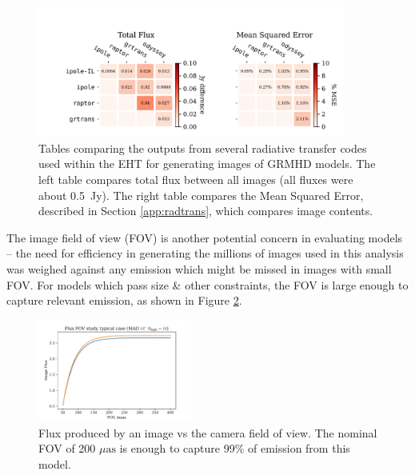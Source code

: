 \begin{figure}
  \centering
  \includegraphics[width=0.9\textwidth]{figures/grmhd_hi_IntegratedUnpolarizeds_plot.pdf}
  \caption{Tables comparing the outputs from several radiative transfer codes used within the EHT for generating images of GRMHD models.  The left table compares total flux between all images (all fluxes were about 0.5~Jy). The right table compares the Mean Squared Error, described in Section \ref{app:radtrans}, which compares image contents. }
  \label{fig:radtrans_grmhd_comp}
\end{figure}

The image field of view (FOV) is another potential concern in evaluating models -- the need for efficiency in generating the millions of images used in this analysis was weighed against any emission which might be missed in images with small FOV. For models which pass size \& other constraints, the FOV is large enough to capture relevant emission, as shown in Figure \ref{fig:radtrans_fov_study}.

\begin{figure}
  \centering
  \includegraphics[width=0.45\textwidth]{figures/fov_study.pdf}
  \caption{Flux produced by an image vs the camera field of view.  The nominal FOV of 200 $\mu\mathrm{as}$ is enough to capture 99\% of emission from this model.}
  \label{fig:radtrans_fov_study}
\end{figure}

